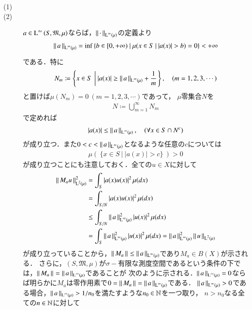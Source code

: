 \begin{prf}
\begin{description}\mbox{}
	\item[(1)] 
	\item[(2)] $a \in \operatorname{L}^{\infty} \left(S, \mathfrak{M}, \mu\right)$ならば，$\left\|\, \cdot\, \right\|_{\operatorname{L}^{\infty} \left(\mu\right)}$の定義より
		\begin{align}
			\left\|\, a\, \right\|_{\operatorname{L}^{\infty} \left(\mu\right)} = \operatorname*{inf}_{} \left\{b \in [0, +\infty)\ |\ \mu(x \in S\ |\ |a(x)| > b) = 0 \right\} < +\infty
		\end{align}
		である．特に
		\begin{align}
			N_m \coloneqq \left\{x \in S\ \left|\ |a(x)| \geq \left\|\, a\, \right\|_{\operatorname{L}^{\infty} \left(\mu\right)} + \frac{1}{m} \right.\right\}, \quad(m = 1,2,3,\cdots)
		\end{align}
		と置けば$\mu(N_m)=0\ (m=1,2,3,\cdots)$であって，
		$\mu$零集合$N$を
		\begin{align}
			N \coloneqq \bigcup_{m=1}^{\infty} N_m
		\end{align}
		で定めれば
		\begin{align}
			|a(x)| \leq \left\|\, a\, \right\|_{\operatorname{L}^{\infty} \left(\mu\right)}, \quad (\forall x \in S \cap N^c)
		\end{align}
		が成り立つ．また$0 < c < \left\|\, a\, \right\|_{\operatorname{L}^{\infty} \left(\mu\right)}$となるような任意の$c$については
		\begin{align}
			\mu(\ \{x \in S\ |\ |a(x)| > c\}\ ) > 0 \label{eq:func_analy_Linfty}
		\end{align}
		が成り立つことにも注意しておく．全ての$u \in X$に対して
		\begin{align}
			\left\|\, M_a u\, \right\|_{\operatorname{L}^{2} \left(\mu\right)}^2 
			&= \int_{S} |a(x)u(x)|^2\, \mu(dx) \\
			&= \int_{S/N} |a(x)u(x)|^2\, \mu(dx) \\
			&\leq \int_{S/N} \left\|\, a\, \right\|_{\operatorname{L}^{\infty} \left(\mu\right)}^2|u(x)|^2\, \mu(dx) \\
			&= \int_{S} \left\|\, a\, \right\|_{\operatorname{L}^{\infty} \left(\mu\right)}^2|u(x)|^2\, \mu(dx)
			= \left\|\, a\, \right\|_{\operatorname{L}^{\infty} \left(\mu\right)}^2 \left\|\, u\, \right\|_{\operatorname{L}^{2} \left(\mu\right)}
		\end{align}
		が成り立っていることから，$\left\|\, M_a\, \right\|_{} \leq \left\|\, a\, \right\|_{\operatorname{L}^{\infty} \left(\mu\right)}$であり$M_a \in B(X)$が示される．
		さらに，$(S, \mathfrak{M}, \mu)$が$\sigma-$有限な測度空間であるという条件の下では，$\left\|\, M_a\, \right\|_{} = \left\|\, a\, \right\|_{\operatorname{L}^{\infty} \left(\mu\right)}$であることが
		次のように示される．$\left\|\, a\, \right\|_{\operatorname{L}^{\infty} \left(\mu\right)} = 0$ならば明らかに$M_a$は零作用素で$0 = \left\|\, M_a\, \right\|_{} = \left\|\, a\, \right\|_{\operatorname{L}^{\infty} \left(\mu\right)}$である．
		$\left\|\, a\, \right\|_{\operatorname{L}^{\infty} \left(\mu\right)} > 0$である場合，$\left\|\, a\, \right\|_{\operatorname{L}^{\infty} \left(\mu\right)} > 1/n_0$を満たすような$n_0 \in \mathbb{N}$を一つ取り，
		$n > n_0$なる全ての$n \in \mathbb{N}$に対して

\end{description}
\end{prf}
